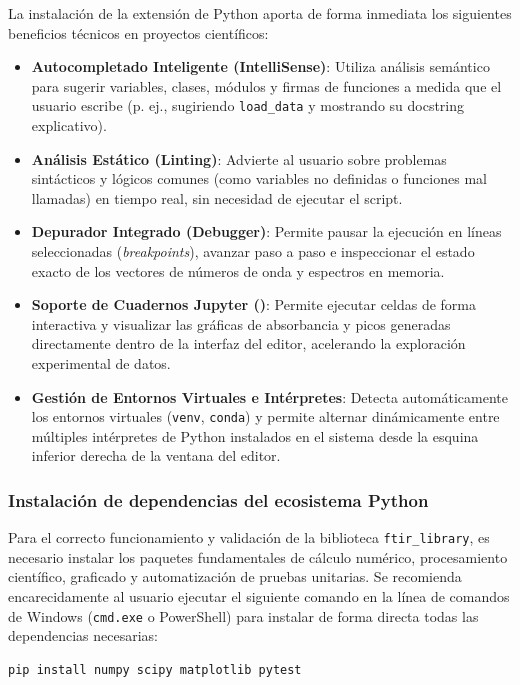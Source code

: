 La instalación de la extensión de Python aporta de forma inmediata los siguientes beneficios técnicos en proyectos científicos:
\begin{itemize}
    \item \textbf{Autocompletado Inteligente (IntelliSense)}: Utiliza análisis semántico para sugerir variables, clases, módulos y firmas de funciones a medida que el usuario escribe (p. ej., sugiriendo \texttt{load\_data} y mostrando su docstring explicativo).
    \item \textbf{Análisis Estático (Linting)}: Advierte al usuario sobre problemas sintácticos y lógicos comunes (como variables no definidas o funciones mal llamadas) en tiempo real, sin necesidad de ejecutar el script.
    \item \textbf{Depurador Integrado (Debugger)}: Permite pausar la ejecución en líneas seleccionadas (\textit{breakpoints}), avanzar paso a paso e inspeccionar el estado exacto de los vectores de números de onda y espectros en memoria.
    \item \textbf{Soporte de Cuadernos Jupyter ()}: Permite ejecutar celdas de forma interactiva y visualizar las gráficas de absorbancia y picos generadas directamente dentro de la interfaz del editor, acelerando la exploración experimental de datos.
    \item \textbf{Gestión de Entornos Virtuales e Intérpretes}: Detecta automáticamente los entornos virtuales (\texttt{venv}, \texttt{conda}) y permite alternar dinámicamente entre múltiples intérpretes de Python instalados en el sistema desde la esquina inferior derecha de la ventana del editor.
\end{itemize}

\subsubsection{Instalación de dependencias del ecosistema Python}
Para el correcto funcionamiento y validación de la biblioteca \texttt{ftir\_library}, es necesario instalar los paquetes fundamentales de cálculo numérico, procesamiento científico, graficado y automatización de pruebas unitarias. Se recomienda encarecidamente al usuario ejecutar el siguiente comando en la línea de comandos de Windows (\texttt{cmd.exe} o PowerShell) para instalar de forma directa todas las dependencias necesarias:

\begin{lstlisting}[language=bash, caption=Instalacion de las dependencias de la biblioteca mediante pip]
pip install numpy scipy matplotlib pytest
\end{lstlisting}

